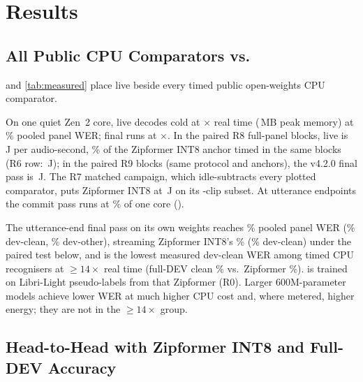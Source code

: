\section{Results}\label{sec:results}

\subsection{All Public CPU Comparators vs.\ \ultra{}}\label{sec:compare}

 and \cref{tab:measured} place \ultra{} live beside every timed public
open-weights CPU comparator. \ColdHostSentence{} \ColdSubsetSentence{}

 On one quiet Zen~2 core, \ultra{} live decodes cold at \ColdLiveSpeed$\times$
real time (\ColdLiveRss\,MB peak memory) at \ColdLiveWer\% pooled panel WER; \ultra{} final runs at
\ColdHeadSpeed$\times$. \ColdMemorySentence{} In the paired R8 full-panel blocks, live is
\ColdLiveWatts\,J per audio-second, \VsEnergyPctOne\% of the Zipformer INT8 anchor timed in the same blocks (R6 row:
\ColdZipRsixWatts\,J); in the paired R9 blocks (same protocol and anchors), the v4.2.0 final pass is \ColdHeadWatts\,J. The R7 matched campaign, which idle-subtracts every plotted comparator,
puts Zipformer INT8 at \RsevenZipEnergy\,J on its \RsevenClips-clip subset. At utterance
endpoints the commit pass runs at \ColdFinalCorePct\% of one core (\ColdFinalVsZipSpeed).

 The utterance-end \ultra{} final pass on its own weights reaches \ColdHeadWer\% pooled panel
WER (\FinPanelClean\% dev-clean, \FinPanelOther\% dev-other), \VsVerdictTwo{} streaming Zipformer INT8's \ColdZipWer\%
(\FinPanelZipClean\% dev-clean) under the paired test below, and is the lowest measured dev-clean WER among timed
CPU recognisers at $\geq 14\times$ real time (full-DEV clean \FinFullClean\% vs.\ Zipformer \FinFullZipClean\%).
\ultra{} is trained on Libri-Light pseudo-labels from that Zipformer (R0). Larger 600M-parameter models
achieve lower WER at much higher CPU cost and, where metered, higher energy; they are not in the $\geq 14\times$ group.

\subsection{Head-to-Head with Zipformer INT8 and Full-DEV Accuracy}\label{sec:versus}

